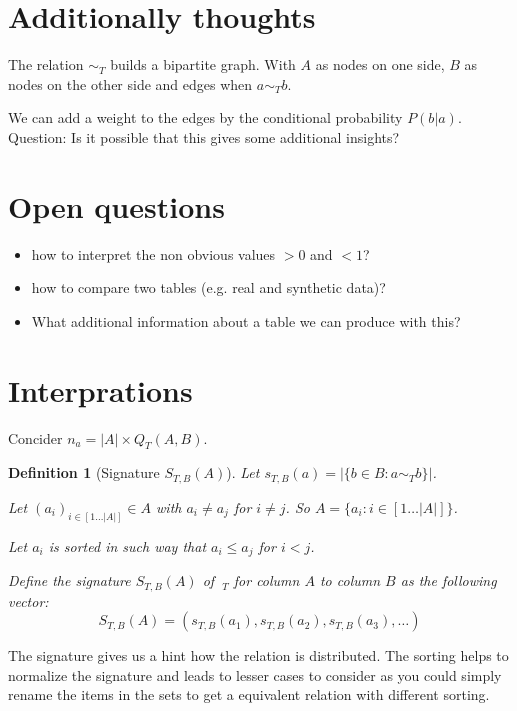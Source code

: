\documentclass[a4paper]{article}
\newtheorem{definition}{Definition}
\begin{document}
\section{Additionally thoughts}
The relation $\sim_T$ builds a bipartite graph.
With $A$ as nodes on one side, $B$ as nodes on the other side and edges when $a \sim_T b$.

We can add a weight to the edges by the conditional probability $P(b|a)$.
Question: Is it possible that this gives some additional insights?


\section{Open questions}
\begin{itemize}
\item how to interpret the non obvious values $> 0$ and $< 1$?
\item how to compare two tables (e.g. real and synthetic data)?
\item What additional information about a table we can produce with this?
\end{itemize}



\section{Interprations}
Concider $n_a = |A| \times Q_T(A,B)$. 

\begin{definition}[Signature $S_{T,B}(A)$]
  Let $s_{T,B}(a) = |\{ b \in B : a \sim_T b \}|$.

  Let $(a_i)_{i \in [1 \ldots |A|]} \in A$ with $a_i \neq a_j$ for $i \neq j$.
  So $A = \{ a_i : i \in [1 \ldots |A|] \}$.

  Let $a_i$ is sorted in such way that $a_i \leq a_j$ for $i < j$.

  Define the signature $S_{T,B}(A)$ of $~_T$ for column $A$ to column $B$ as the following vector:
  \begin{equation}
    S_{T,B}(A) = (s_{T,B}(a_1), s_{T,B}(a_2), s_{T,B}(a_3), \ldots )
  \end{equation}
\end{definition}

The signature gives us a hint how the relation is distributed.
The sorting helps to normalize the signature and leads to lesser cases to consider as you could simply rename the items in the sets to get a equivalent relation with different sorting.
\end{document}
